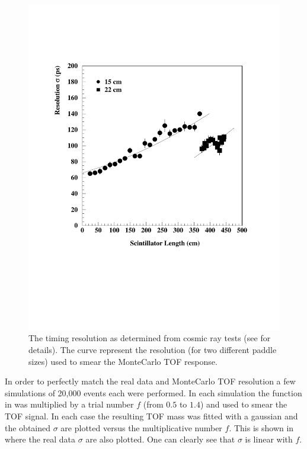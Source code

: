 \begin{figure}[h]
 \includegraphics[width = 13cm, bb=-110 180 610 700]{acceptance/img/fit_laser_sigma}
 \caption[The timing resolution as determined from cosmic ray tests]
         { The timing resolution as determined from cosmic ray tests (see \cite{bib:tof}
	            for details). The curve represent the resolution (for two different paddle sizes)
		    used to smear the MonteCarlo TOF response. }
 \label{fig:fit_laser}
\end{figure}

In order to perfectly match the real data and MonteCarlo TOF resolution 
a few simulations of 20,000 events each were performed. In each simulation 
the function in 
was multiplied by a trial number $f$ (from $0.5$ to $1.4$) and used to smear the TOF signal.
In each case the resulting TOF mass  was fitted
with a gaussian and the obtained $\sigma$ are plotted versus the multiplicative number $f$.
This is shown  in 
where the real data $\sigma$ are also plotted. One can clearly see that $\sigma$ is linear
with $f$. 

